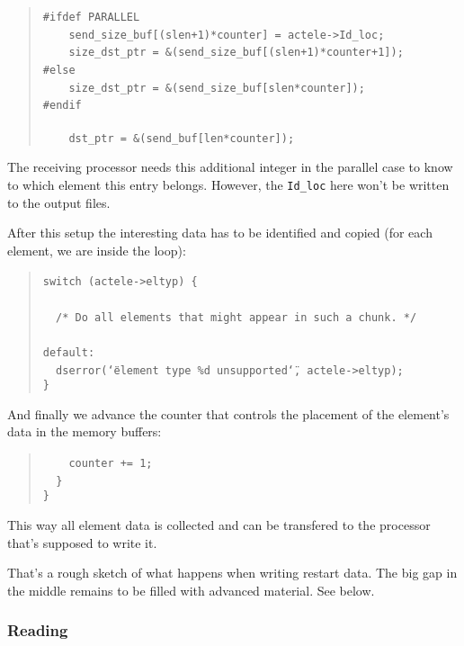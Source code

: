 \begin{quote}
\texttt{{\#}ifdef~PARALLEL~}~\\
 \texttt{~~~~send{\_}size{\_}buf{[}(slen+1){*}counter]~=~actele->Id{\_}loc;~}~\\
 \texttt{~~~~size{\_}dst{\_}ptr~=~{\&}(send{\_}size{\_}buf{[}(slen+1){*}counter+1]);~}~\\
 \texttt{{\#}else~}~\\
 \texttt{~~~~size{\_}dst{\_}ptr~=~{\&}(send{\_}size{\_}buf{[}slen{*}counter]);~}~\\
 \texttt{{\#}endif~}~\\
 \texttt{~}~\\
 \texttt{~~~~dst{\_}ptr~=~{\&}(send{\_}buf{[}len{*}counter]); }
\end{quote}
The receiving processor needs this additional integer in the parallel
case to know to which element this entry belongs. However, the \texttt{Id{\_}loc}
here won't be written to the output files.

After this setup the interesting data has to be identified and copied
(for each element, we are inside the loop): 

\begin{quote}
\texttt{switch~(actele->eltyp)~{\{}~}~\\
 \texttt{~}~\\
 \texttt{~~/{*}~Do~all~elements~that~might~appear~in~such~a~chunk.~{*}/~}~\\
 \texttt{~}~\\
 \texttt{default:~}~\\
 \texttt{~~dserror(\char`\"{}element~type~{\%}d~unsupported\char`\"{},~actele->eltyp);~}~\\
 \texttt{{\}} }
\end{quote}
And finally we advance the counter that controls the placement of
the element's data in the memory buffers: 

\begin{quote}
\texttt{~~~~counter~+=~1;~}~\\
 \texttt{~~{\}}~}~\\
 \texttt{{\}} }
\end{quote}
This way all element data is collected and can be transfered to the
processor that's supposed to write it.

That's a rough sketch of what happens when writing restart data. The
big gap in the middle remains to be filled with advanced material.
See below.


\subsubsection{Reading}

